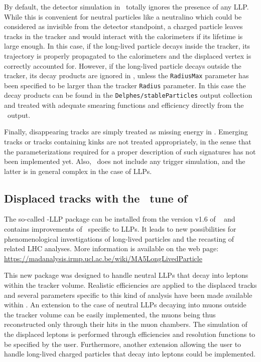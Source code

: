 By default, the detector simulation in \DEL\ totally ignores the presence of any
LLP. While this is convenient for neutral particles like a
neutralino which could be considered as invisible from the detector standpoint,
a charged particle leaves tracks in the tracker and would interact with the
calorimeters if its lifetime is large enough.
In this case, if the long-lived particle decays inside the tracker, its
trajectory is properly propagated to the calorimeters and the displaced vertex
is correctly accounted for. However, if the long-lived particle decays outside
the tracker, its decay products are ignored in \DEL, unless the \verb+RadiusMax+
parameter has been specified to be larger than the tracker \verb+Radius+
parameter. In this case the decay products can be found in the
\verb+Delphes/stableParticles+ output collection and
treated with adequate smearing functions and efficiency directly from the \DEL\
output.

Finally, disappearing tracks are simply treated as missing energy in \DEL. Emerging tracks or tracks containing kinks are not treated appropriately, in the sense that the parameterizations required for a proper description of such signatures has not been implemented yet. Also, \DEL\ does not include any trigger simulation, and the latter is in general complex in the case of LLPs.

\subsection{Displaced tracks with the \MA\ tune of \DEL}

The so-called \DEL-LLP package can be installed from the version v1.6 of
\MA~\cite{Conte:2012fm,Conte:2014zja} and contains improvements of \DEL\
specific to LLPs. It
leads to new possibilities for phenomenological investigations of long-lived
particles and the recasting of related LHC analyses. More information is
available on the web page:\\ \noindent \url{https://madanalysis.irmp.ucl.ac.be/wiki/MA5LongLivedParticle}

This new package was designed to handle neutral LLPs that decay
into leptons within the tracker volume. Realistic efficiencies are applied to
the displaced tracks and several parameters specific to this kind of analysis
have been made available within \MA. An extension to the case of neutral
LLPs decaying into muons outside the tracker volume can be easily
implemented, the muons being thus reconstructed only through their hits in the
muon chambers. The simulation of the displaced leptons is performed through efficiencies and resolution functions to be specified by the user. Furthermore, another
extension allowing the user to handle long-lived charged particles that decay into
leptons could be implemented.

